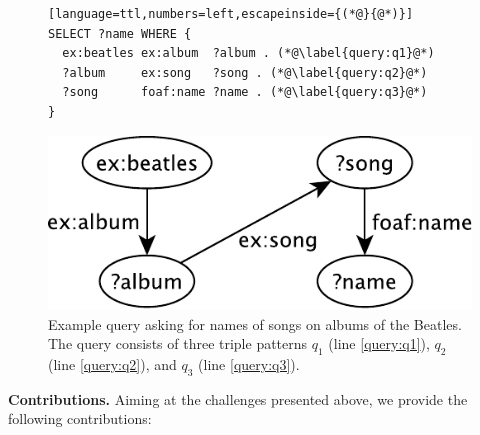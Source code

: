 \begin{figure}[htb]
  \centering
  \begin{minipage}{0.75\linewidth}
\begin{lstlisting}[language=ttl,numbers=left,escapeinside={(*@}{@*)}]
SELECT ?name WHERE {
  ex:beatles ex:album  ?album . (*@\label{query:q1}@*)
  ?album     ex:song   ?song . (*@\label{query:q2}@*)
  ?song      foaf:name ?name . (*@\label{query:q3}@*)
}
\end{lstlisting}
  \end{minipage}
  \includegraphics[width=0.7\linewidth]{figs/query-crop.pdf}
  \caption{Example query asking for names of songs on albums of the
    Beatles. The query consists of three triple patterns $q_1$ (line
    \ref{query:q1}), $q_2$ (line \ref{query:q2}), and $q_3$ (line
    \ref{query:q3}).}
  \label{fig:query}
\end{figure}

\textbf{Contributions.} Aiming at the challenges presented above, we
provide the following contributions:


